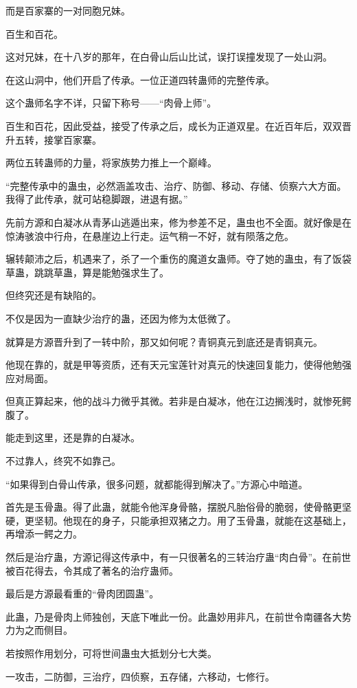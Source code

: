\begin{this_body}
而是百家寨的一对同胞兄妹。

百生和百花。

这对兄妹，在十八岁的那年，在白骨山后山比试，误打误撞发现了一处山洞。

在这山洞中，他们开启了传承。一位正道四转蛊师的完整传承。

这个蛊师名字不详，只留下称号——“肉骨上师”。

百生和百花，因此受益，接受了传承之后，成长为正道双星。在近百年后，双双晋升五转，接掌百家寨。

两位五转蛊师的力量，将家族势力推上一个巅峰。

“完整传承中的蛊虫，必然涵盖攻击、治疗、防御、移动、存储、侦察六大方面。我得了此传承，就可站稳脚跟，进退有据。”

先前方源和白凝冰从青茅山逃遁出来，修为参差不足，蛊虫也不全面。就好像是在惊涛骇浪中行舟，在悬崖边上行走。运气稍一不好，就有陨落之危。

辗转颠沛之后，机遇来了，杀了一个重伤的魔道女蛊师。夺了她的蛊虫，有了饭袋草蛊，跳跳草蛊，算是能勉强求生了。

但终究还是有缺陷的。

不仅是因为一直缺少治疗的蛊，还因为修为太低微了。

就算是方源晋升到了一转中阶，那又如何呢？青铜真元到底还是青铜真元。

他现在靠的，就是甲等资质，还有天元宝莲针对真元的快速回复能力，使得他勉强应对局面。

但真正算起来，他的战斗力微乎其微。若非是白凝冰，他在江边搁浅时，就惨死鳄腹了。

能走到这里，还是靠的白凝冰。

不过靠人，终究不如靠己。

“如果得到白骨山传承，很多问题，就都能得到解决了。”方源心中暗道。

首先是玉骨蛊。得了此蛊，就能令他浑身骨骼，摆脱凡胎俗骨的脆弱，使骨骼更坚硬，更坚韧。他现在的身子，只能承担双猪之力。用了玉骨蛊，就能在这基础上，再增添一鳄之力。

然后是治疗蛊，方源记得这传承中，有一只很著名的三转治疗蛊“肉白骨”。在前世被百花得去，令其成了著名的治疗蛊师。

最后是方源最看重的“骨肉团圆蛊”。

此蛊，乃是骨肉上师独创，天底下唯此一份。此蛊妙用非凡，在前世令南疆各大势力为之而侧目。

若按照作用划分，可将世间蛊虫大抵划分七大类。

一攻击，二防御，三治疗，四侦察，五存储，六移动，七修行。


\end{this_body}
